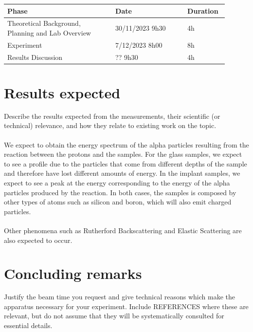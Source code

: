 \documentclass{article}
\begin{document}
\begin{multicols}{2}
\begin{table}[H]
\centering
\begin{tabular}{|w{0.45\linewidth}|w{0.3\linewidth}|w{0.15\linewidth}|}
\hline
Phase & Date & Duration \\ \hline
Theoretical Background, Planning and Lab Overview & 30/11/2023 9h30 & 4h \\ \hline
Experiment & 7/12/2023 8h00 & 8h \\ \hline
Results Discussion & ?? 9h30 & 4h \\ \hline
\end{tabular}
\end{table}

\section{Results expected}

Describe the results expected from the measurements, their scientific (or technical) relevance, and how they relate to existing work on the topic.

\paragraph{}

We expect to obtain the energy spectrum of the alpha particles resulting from the reaction between the protons and the samples. 
For the glass samples, we expect to see a profile due to the particles that come from different depths of the sample and therefore have lost different amounts of energy. In the implant samples, we expect to see a peak at the energy corresponding to the energy of the alpha particles produced by the reaction.
In both cases, the samples is composed by other types of atoms such as silicon and boron, which will also emit charged particles.

\paragraph{}

Other phenomena such as Rutherford Backscattering and Elastic Scattering are also expected to occur.

\section{Concluding remarks}

Justify the beam time you request and give technical reasons which make the apparatus necessary for your experiment. Include REFERENCES where these are relevant, but do not assume that they will be systematically consulted for essential details.

\printbibliography
\nocite{*}

\end{multicols}
\end{document}
